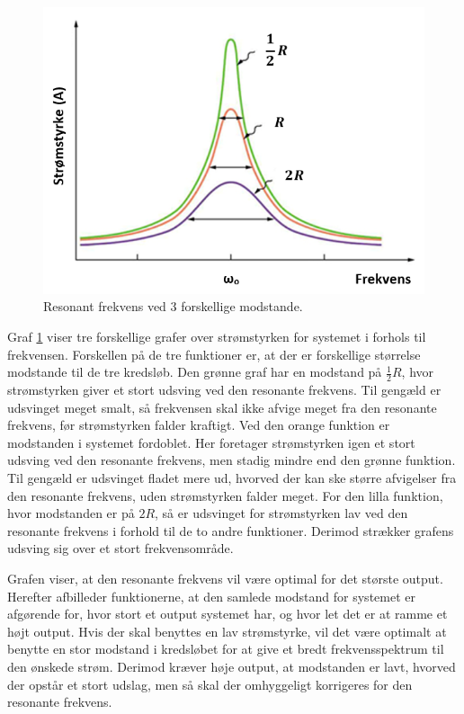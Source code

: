 \begin{figure}[H]
\centering
\includegraphics[scale=0.75]{Vildledning/Schematics/Resonanskurver}
\caption{Resonant frekvens ved 3 forskellige modstande.}
\label{figure:resonantfrekvens}
\end{figure}

Graf \ref{figure:resonantfrekvens} viser tre forskellige grafer over strømstyrken for systemet i forhols til frekvensen. Forskellen på de tre funktioner er, at der er forskellige størrelse modstande til de tre kredsløb. Den grønne graf har en modstand på $\frac{1}{2} R$, hvor strømstyrken giver et stort udsving ved den resonante frekvens. Til gengæld er udsvinget meget smalt, så frekvensen skal ikke afvige meget fra den resonante frekvens, før strømstyrken falder kraftigt. Ved den orange funktion er modstanden i systemet fordoblet. Her foretager strømstyrken igen et stort udsving ved den resonante frekvens, men stadig mindre end den grønne funktion. Til gengæld er udsvinget fladet mere ud, hvorved der kan ske større afvigelser fra den resonante frekvens, uden strømstyrken falder meget. For den lilla funktion, hvor modstanden er på $2 R$, så er udsvinget for strømstyrken lav ved den resonante frekvens i forhold til de to andre funktioner. Derimod strækker grafens udsving sig over et stort frekvensområde.

Grafen viser, at den resonante frekvens vil være optimal for det største output. Herefter afbilleder funktionerne, at den samlede modstand for systemet er afgørende for, hvor stort et output systemet har, og hvor let det er at ramme et højt output. Hvis der skal benyttes en lav strømstyrke, vil det være optimalt at benytte en stor modstand i kredsløbet for at give et bredt frekvensspektrum til den ønskede strøm. Derimod kræver høje output, at modstanden er lavt, hvorved der opstår et stort udslag, men så skal der omhyggeligt korrigeres for den resonante frekvens.


